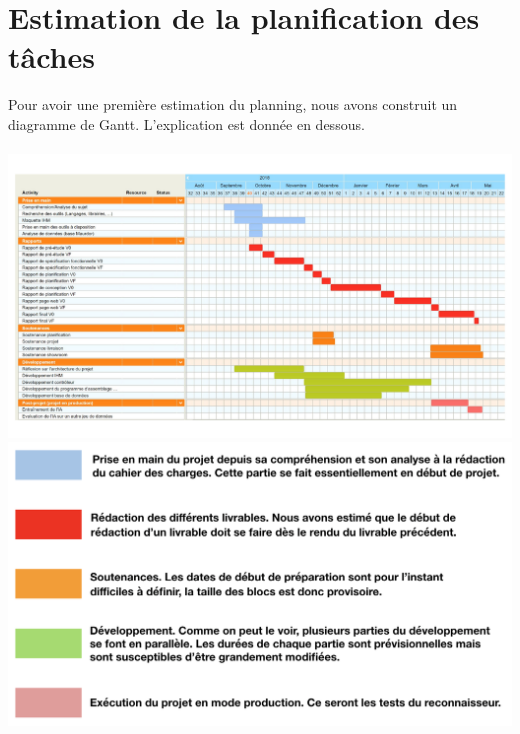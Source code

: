\section{Estimation de la planification des tâches}

Pour avoir une première estimation du planning, nous avons construit un diagramme de Gantt. L’explication est donnée en dessous.

\paragraph{}
\begin{mdframed}[frametitle={Figure 15 : Estimation de la planification des tâches}, innerbottommargin=10]
\begin{center}
\includegraphics[width=\linewidth]{gantt.pdf}
\includegraphics[width=\linewidth]{legende.png}
\end{center}
\end{mdframed}